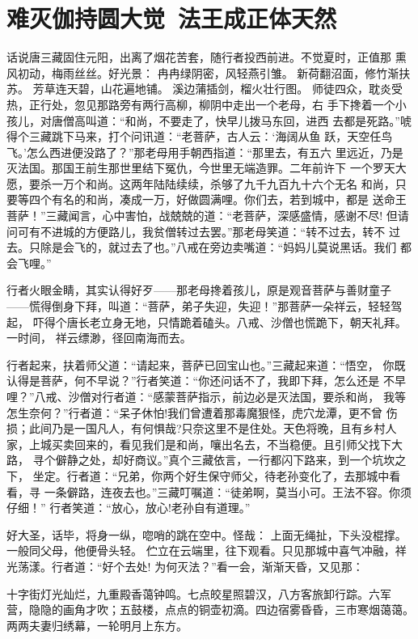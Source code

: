 \chapter{难灭伽持圆大觉~法王成正体天然}

话说唐三藏固住元阳，出离了烟花苦套，随行者投西前进。不觉夏时，正值那
熏风初动，梅雨丝丝。好光景：
冉冉绿阴密，风轻燕引雏。
新荷翻沼面，修竹渐扶苏。
芳草连天碧，山花遍地铺。
溪边蒲插剑，榴火壮行图。
师徒四众，耽炎受热，正行处，忽见那路旁有两行高柳，柳阴中走出一个老母，右
手下搀着一个小孩儿，对唐僧高叫道：“和尚，不要走了，快早儿拨马东回，进西
去都是死路。”唬得个三藏跳下马来，打个问讯道：“老菩萨，古人云：‘海阔从鱼
跃，天空任鸟飞。’怎么西进便没路了？”那老母用手朝西指道：“那里去，有五六
里远近，乃是灭法国。那国王前生那世里结下冤仇，今世里无端造罪。二年前许下
一个罗天大愿，要杀一万个和尚。这两年陆陆续续，杀够了九千九百九十六个无名
和尚，只要等四个有名的和尚，凑成一万，好做圆满哩。你们去，若到城中，都是
送命王菩萨！”三藏闻言，心中害怕，战兢兢的道：“老菩萨，深感盛情，感谢不尽!
但请问可有不进城的方便路儿，我贫僧转过去罢。”那老母笑道：“转不过去，转不
过去。只除是会飞的，就过去了也。”八戒在旁边卖嘴道：“妈妈儿莫说黑话。我们
都会飞哩。”

行者火眼金睛，其实认得好歹——那老母搀着孩儿，原是观音菩萨与善财童子
——慌得倒身下拜，叫道：“菩萨，弟子失迎，失迎！”那菩萨一朵祥云，轻轻驾起，
吓得个唐长老立身无地，只情跪着磕头。八戒、沙僧也慌跪下，朝天礼拜。一时间，
祥云缥渺，径回南海而去。

行者起来，扶着师父道：“请起来，菩萨已回宝山也。”三藏起来道：“悟空，
你既认得是菩萨，何不早说？”行者笑道：“你还问话不了，我即下拜，怎么还是
不早哩？”八戒、沙僧对行者道：“感蒙菩萨指示，前边必是灭法国，要杀和尚，
我等怎生奈何？”行者道：“呆子休怕!我们曾遭着那毒魔狠怪，虎穴龙潭，更不曾
伤损；此间乃是一国凡人，有何惧哉?只奈这里不是住处。天色将晚，且有乡村人
家，上城买卖回来的，看见我们是和尚，嚷出名去，不当稳便。且引师父找下大路，
寻个僻静之处，却好商议。”真个三藏依言，一行都闪下路来，到一个坑坎之下，
坐定。行者道：“兄弟，你两个好生保守师父，待老孙变化了，去那城中看看，寻
一条僻路，连夜去也。”三藏叮嘱道：“徒弟啊，莫当小可。王法不容。你须仔细！”
行者笑道：“放心，放心!老孙自有道理。”

好大圣，话毕，将身一纵，唿哨的跳在空中。怪哉：
上面无绳扯，下头没棍撑。
一般同父母，他便骨头轻。
伫立在云端里，往下观看。只见那城中喜气冲融，祥光荡漾。行者道：“好个去处!
为何灭法？”看一会，渐渐天昏，又见那：

十字街灯光灿烂，九重殿香蔼钟鸣。七点皎星照碧汉，八方客旅卸行踪。六军
营，隐隐的画角才吹；五鼓楼，点点的铜壶初滴。四边宿雾昏昏，三市寒烟蔼蔼。
两两夫妻归绣幕，一轮明月上东方。

